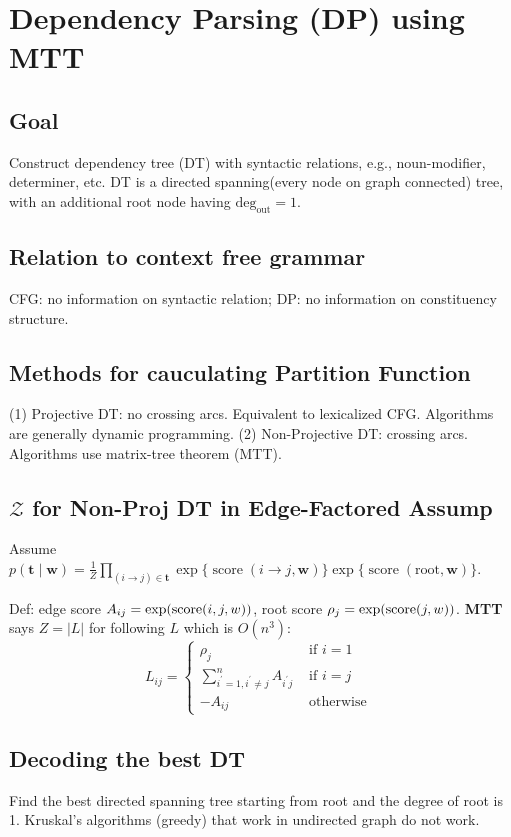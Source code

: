 \section{Dependency Parsing (DP) using MTT}

\subsection*{Goal} Construct dependency tree (DT) with syntactic relations, e.g., noun-modifier, determiner, etc. DT is a directed spanning(every node on graph connected) tree, with an additional root node having $\mathrm{deg}_{\mathrm{out}}=1$.

\subsection*{Relation to context free grammar}
CFG: no information on syntactic relation; DP: no information on constituency structure. 

\subsection*{Methods for cauculating Partition Function} 
(1) Projective DT: no crossing arcs. Equivalent to lexicalized CFG. Algorithms are generally dynamic programming. 
(2) Non-Projective DT: crossing arcs. Algorithms use matrix-tree theorem (MTT).


\subsection*{$\mathcal{Z}$ for Non-Proj DT in Edge-Factored Assump}
Assume $p(\mathbf{t} \mid \mathbf{w})=\frac{1}{Z} \prod_{(i \rightarrow j) \in \mathbf{t}} \exp \{\operatorname{score}(i\to j, \mathbf{w})\} \exp \{\operatorname{score}(\mathrm{root}, \mathbf{w})\}$.

Def: edge score $A_{ij}=\exp(\text{score}(i,j,w))$, root score $\rho_j = \exp(\text{score}(j,w))$. \textbf{MTT} says $Z=|L|$ for following $L$ which is $O(n^3)$:
\vspace{-0.3cm}
$$L_{i j}= \begin{cases}\rho_{j} & \text { if } i=1 \\ \sum_{i^{\prime}=1, i^{\prime} \neq j}^{n} A_{i^{\prime} j} & \text { if } i=j \\ -A_{i j} & \text { otherwise }\end{cases}$$
\vspace{-0.3cm}

\subsection*{Decoding the best DT}
Find the best directed spanning tree starting from root and the degree of root is 1. \; Kruskal's algorithms (greedy) that work in undirected graph do not work.

